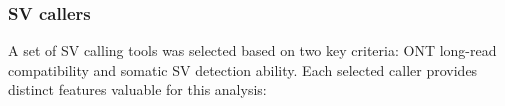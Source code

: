 
\subsubsection{SV callers}

A set of SV calling tools was selected based on two key criteria: ONT 
long-read compatibility and somatic SV detection ability. Each selected caller 
provides distinct features valuable for this analysis:


